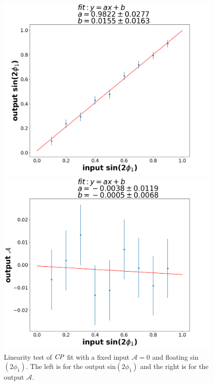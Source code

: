 \begin{figure}[htpb]
	\begin{minipage}{0.5\linewidth}
		\includegraphics[width=1\linewidth]{figures/S-test-line}
	\end{minipage}
	\begin{minipage}{0.5\linewidth}
		\includegraphics[width=1\linewidth]{figures/A-test-line}
	\end{minipage}
	\caption{Linearity test of $\it{CP}$ fit with a fixed input $\mathcal{A}=0$ and floating sin$(2\phi_1)$. The left is for the output sin$(2\phi_1)$ and the right is for the output $\mathcal{A}$.}
	\label{fig:cpfit_line_S}
\end{figure}

